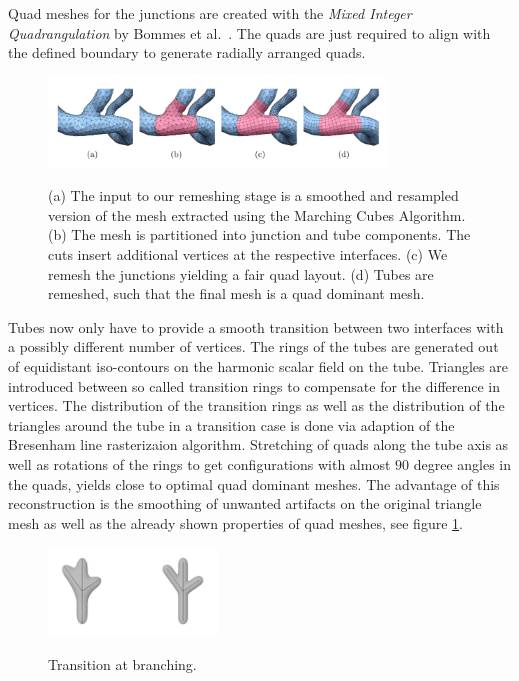 Quad meshes for the junctions are created with the \emph{Mixed Integer Quadrangulation} by Bommes et al.~\cite{bommes2009mixed}. The quads are just required to align with the defined boundary to generate radially arranged quads.

\begin{figure}[h]
	\centering
	\includegraphics[width=0.8\textwidth]{./Images/Remeshing_stage.png} \\
	\caption{ (a) The input to our remeshing stage is a smoothed and resampled version of the mesh extracted using the Marching Cubes Algorithm. (b) The mesh is partitioned into junction and tube components. The cuts insert additional vertices at the respective interfaces. (c) We remesh the junctions yielding a fair quad layout. (d) Tubes are remeshed, such that the final mesh is a quad dominant mesh.}
	\cite{sibbing2012topology}
	\label{fig:Remeshing_stage}
\end{figure}

Tubes now only have to provide a smooth transition between two interfaces with a possibly different number of vertices. The rings of the tubes are generated out of equidistant iso-contours on the harmonic scalar field on the tube. Triangles are introduced between so called transition rings to compensate for the difference in vertices. The distribution of the transition rings as well as the distribution of the triangles around the tube in a transition case is done via adaption of the Bresenham line rasterizaion algorithm. Stretching of quads along the tube axis as well as rotations of the rings to get configurations with almost $90$ degree angles in the quads, yields close to optimal quad dominant meshes. The advantage of this reconstruction is the smoothing of unwanted artifacts on the original triangle mesh as well as the already shown properties of quad meshes, see figure \ref{fig:Remeshing_stage}.


\begin{figure}[h]
	\centering
	\includegraphics[width=0.4\textwidth]{./Images/Branching_ConvolutionSurfaces.png} \\
	\caption{Transition at branching.}
	\cite{oeltze2005visualization}
	\label{fig:Branching_ConvolutionSurfaces}
\end{figure}

